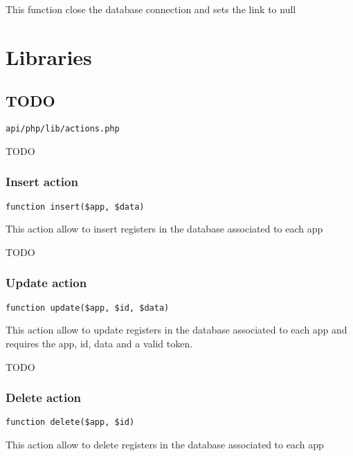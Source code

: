 \documentclass[a4paper]{article}
\begin{document}
This function close the database connection and sets the link to null


\hypertarget{toc362}{}
\section{Libraries}

\hypertarget{toc363}{}
\subsection{TODO}

\begin{lstlisting}
api/php/lib/actions.php
\end{lstlisting}

TODO

\hypertarget{toc364}{}
\subsubsection{Insert action}

\begin{lstlisting}
function insert($app, $data)
\end{lstlisting}

This action allow to insert registers in the database associated to
each app

TODO

\hypertarget{toc365}{}
\subsubsection{Update action}

\begin{lstlisting}
function update($app, $id, $data)
\end{lstlisting}

This action allow to update registers in the database associated to
each app and requires the app, id, data and a valid token.

TODO

\hypertarget{toc366}{}
\subsubsection{Delete action}

\begin{lstlisting}
function delete($app, $id)
\end{lstlisting}

This action allow to delete registers in the database associated to
each app
\end{document}
